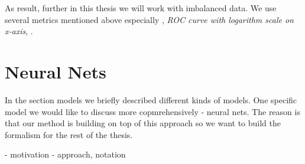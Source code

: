 As result, further in this thesis we will work with imbalanced data. We use several metrics mentioned above especially \cite{balanced accuracy}, \emph{ROC curve with logarithm scale on x-axis}, \cite{PR curve}.
\section{Neural Nets}
In the section models we briefly described different kinds of models. One specific model we would like to discuss more copmrehensively - neural nets. The reason is that our method is building on top of this approach so we want to build the formalism for the rest of the thesis.

- motivation
- approach, notation








